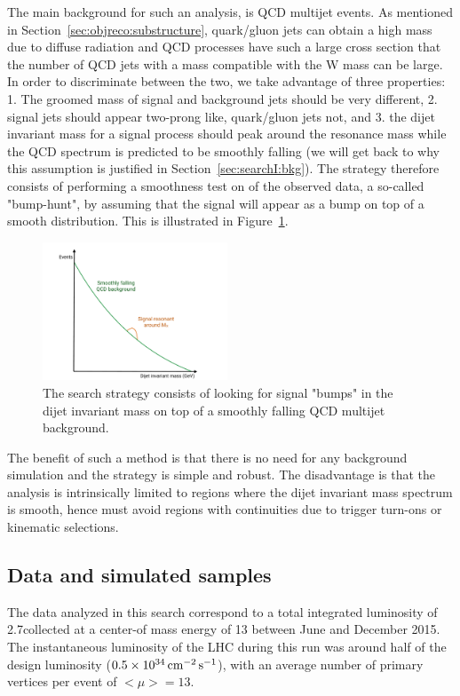 The main background for such an analysis, is QCD multijet events. As mentioned in Section~\ref{sec:objreco:substructure}, quark/gluon jets can obtain a high mass due to diffuse radiation and QCD processes have such a large cross section that the number of QCD jets with a mass compatible with the W mass can be large. In order to discriminate between the two, we take advantage of three properties: 1. The groomed mass of signal and background jets should be very different, 2. signal jets should appear two-prong like, quark/gluon jets not, and 3. the dijet invariant mass for a signal process should peak around the resonance mass while the QCD spectrum is predicted to be smoothly falling (we will get back to why this assumption is justified in Section~\ref{sec:searchI:bkg}). The strategy therefore consists of performing a smoothness test on \mjj of the observed data, a so-called "bump-hunt", by assuming that the signal will appear as a bump on top of a smooth distribution. This is illustrated in Figure~\ref{fig:searchI:bumphunt}.

\begin{figure}[ht] 
    \centering
    \includegraphics[width=0.49\textwidth]{figures/analysis/search1/misc/sigExtraction.pdf}
    \caption{The search strategy consists of looking for signal "bumps" in the dijet invariant mass on top of a smoothly falling QCD multijet background.}
    \label{fig:searchI:bumphunt}
\end{figure}

The benefit of such a method is that there is no need for any background simulation and the strategy is simple and robust. The disadvantage is that the analysis is intrinsically limited to regions where the dijet invariant mass spectrum is smooth, hence must avoid regions with continuities due to trigger turn-ons or kinematic selections.

\subsection{Data and simulated samples}
The data analyzed in this search correspond to a total integrated luminosity of 2.7\fbinv collected at a center-of mass energy of 13 \TeV between June and December 2015. The instantaneous luminosity of the LHC during this run was around half of the design luminosity ($0.5 \times 10^{34} \,\text{cm}^\text{$-$2}\,\text{s}^\text{$-$1}$), with an average number of primary vertices per event of $<\mu>=13$. \par\par

